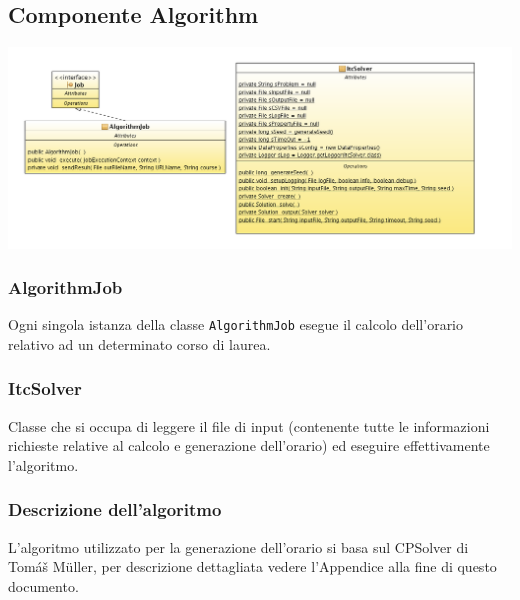 \documentclass[11pt,a4paper]{article}
\begin{document}
\subsection{Componente Algorithm}
\includegraphics[scale=0.34]{images/MMalg_diagram_class.png}
\subsubsection{AlgorithmJob}
Ogni singola istanza della classe \verb|AlgorithmJob| esegue il calcolo dell'orario relativo ad un determinato corso di laurea.
\subsubsection{ItcSolver}
Classe che si occupa di leggere il file di input (contenente tutte le informazioni richieste relative al calcolo e generazione dell'orario) ed eseguire effettivamente l'algoritmo.
\subsubsection{Descrizione dell'algoritmo}
L'algoritmo utilizzato per la generazione dell'orario si basa sul CPSolver di Tomáš Müller, per descrizione dettagliata vedere l'Appendice  alla fine di questo documento.
\end{document}
